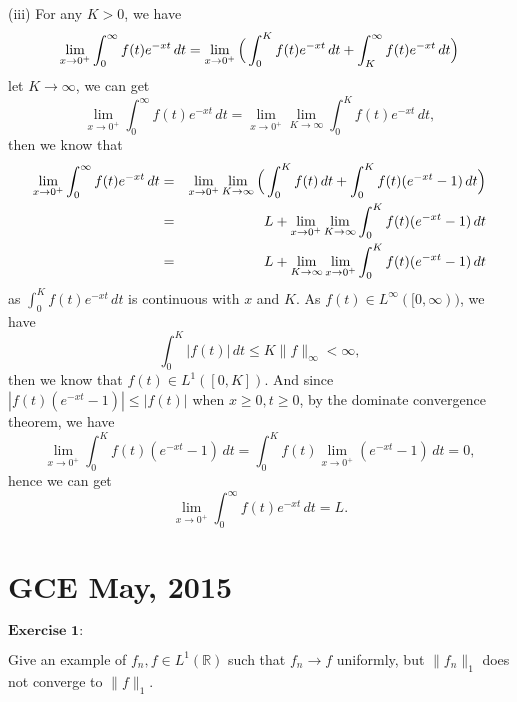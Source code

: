 \documentclass[12pt]{article}
\begin{document}
(iii) For any $K > 0$, we have
\begin{equation*}
    \lim_{x \to 0^{+}} \int_{0}^{ \infty} f(t) e^{- x t} \, d t =  \lim_{x \to 0^{+}} \Big{(} \int_{0}^{K} f(t) e^{- x t} \, d t + \int_{K}^{\infty} f(t) e^{- x t} \, d t \Big{)}
\end{equation*}
let $K \to \infty$, we can get 
\begin{equation*}
    \lim_{x \to 0^{+}} \int_{0}^{ \infty} f(t) e^{- x t} \, d t  =  \lim_{x \to 0^{+}} \lim_{K \to \infty} \int_{0}^{K} f(t) e^{- x t} \, d t, 
\end{equation*}
then we know that 
\begin{eqnarray*}
\lim_{x \to 0^{+}} \int_{0}^{ \infty} f(t) e^{- x t} \, d t 
& = & \lim_{x \to 0^{+}} \lim_{K \to \infty} \Big{(} \int_{0}^{K} f(t) \, d t + \int_{0}^{K} f(t) ( e^{- x t} - 1) \, d t \Big{)} \\
& = & L + \lim_{x \to 0^{+}} \lim_{K \to \infty}  \int_{0}^{K} f(t) ( e^{- x t} - 1) \, d t \\
& = & L + \lim_{K \to \infty} \lim_{x \to 0^{+}} \int_{0}^{K} f(t) ( e^{- x t} - 1) \, d t
\end{eqnarray*}
as $\int_{0}^{K} f(t) e^{- x t} \, d t$ is continuous with $x$ and $K$. As $f(t) \in L^{\infty}([0, \infty))$, we have
\begin{equation*}
    \int_{0}^{K} |f(t)| \, d t \leq K \|f\|_{\infty} < \infty,
\end{equation*}
then we know that $f(t) \in L^{1}([0, K])$. And since $|f(t) ( e^{- x t} - 1)| \leq |f(t)|$ when $x \geq 0, t \geq 0$, by the dominate convergence theorem, we have
\begin{equation*}
    \lim_{x \to 0^{+}} \int_{0}^{K} f(t) (e^{-x t} - 1) \, d t = \int_{0}^{K} f(t) \lim_{x \to 0^{+}} (e^{-x t} - 1) \, d t = 0,
\end{equation*}
hence we can get
\begin{equation*}
    \lim_{x \to 0^{+}} \int_{0}^{ \infty} f(t) e^{- x t} \, d t = L.
\end{equation*}

\newpage

\section{GCE May, 2015}

$\textbf{Exercise 1:}$

Give an example of $f_{n}, f \in L^{1}(\mathbb{R})$ such that $f_{n} \to f$ uniformly, but $\|f_{n}\|_{1}$ does not converge to $\|f\|_{1}$.
\end{document}
